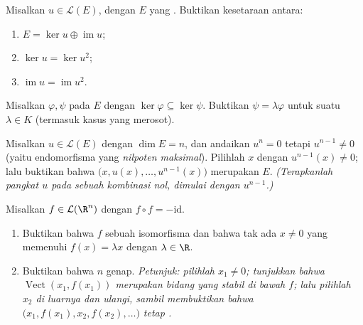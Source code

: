 \begin{exercise}[$\star\star$]\label{exo:b1:linmaps:7}
Misalkan $u \in \mathcal{L}(E)$, dengan $E$ yang . Buktikan
kesetaraan antara:
\begin{enumerate}
  \item $E = \ker u \oplus \operatorname{im} u$;
  \item $\ker u = \ker u^2$;
  \item $\operatorname{im} u = \operatorname{im} u^2$.
\end{enumerate}
\end{exercise}

\begin{exercise}[$\star\star$]\label{exo:b1:linmaps:8}
Misalkan $\varphi, \psi$  pada $E$ dengan $\ker\varphi
\subseteq \ker\psi$. Buktikan $\psi = \lambda\varphi$ untuk suatu
$\lambda \in K$ (termasuk kasus yang merosot).
\end{exercise}

\begin{exercise}[$\star\star\star$]\label{exo:b1:linmaps:9}
Misalkan $u \in \mathcal{L}(E)$ dengan $\dim E = n$, dan andaikan $u^n = 0$
tetapi $u^{n-1} \neq 0$ (yaitu endomorfisma yang \emph{nilpoten maksimal}).
Pilihlah $x$ dengan $u^{n-1}(x) \neq 0$; lalu buktikan bahwa $\bigl(x, u(x), \dots,
u^{n-1}(x)\bigr)$ merupakan  $E$. \emph{(Terapkanlah pangkat $u$ pada sebuah
kombinasi nol, dimulai dengan $u^{n-1}$.)}
\end{exercise}

\begin{exercise}[$\star\star\star$]\label{exo:b1:linmaps:10}
Misalkan $f \in \mathcal{L}(\R^n)$ dengan $f \circ f = -\mathrm{id}$.
\begin{enumerate}
  \item Buktikan bahwa $f$ sebuah isomorfisma dan bahwa tak ada $x \neq 0$
        yang memenuhi $f(x) = \lambda x$ dengan $\lambda \in \R$.
  \item Buktikan bahwa $n$ genap. \emph{Petunjuk: pilihlah $x_1 \neq 0$; tunjukkan
        bahwa $\operatorname{Vect}(x_1, f(x_1))$ merupakan bidang yang stabil di bawah
        $f$; lalu pilihlah $x_2$ di luarnya dan ulangi, sambil membuktikan bahwa
        $\bigl(x_1, f(x_1), x_2, f(x_2), \dots\bigr)$ tetap .}
\end{enumerate}
\end{exercise}

